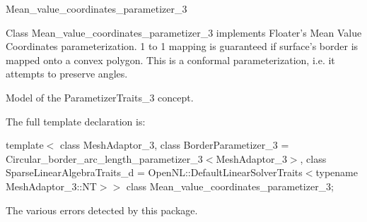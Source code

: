 

\begin{ccRefClass}{Mean_value_coordinates_parametizer_3}  %


\ccDefinition
  

Class Mean\_value\_coordinates\_parametizer\_3 implements Floater's Mean Value Coordinates parameterization. 1 to 1 mapping is guaranteed if surface's border is mapped onto a convex polygon. This is a conformal parameterization, i.e. it attempts to preserve angles.


\ccIsModel

Model of the ParametizerTraits\_3 concept.



\ccParameters

The full template declaration is:

template$<$
class MeshAdaptor\_3, 
class BorderParametizer\_3 = Circular\_border\_arc\_length\_parametizer\_3$<$MeshAdaptor\_3$>$, 
class SparseLinearAlgebraTraits\_d = OpenNL::DefaultLinearSolverTraits$<$typename MeshAdaptor\_3::NT$>$$>$ 
class Mean\_value\_coordinates\_parametizer\_3;


\ccTypes


{
}
{
The various errors detected by this package.
}
{
}
{
}
{
}
{
}
{
}
{
}
{
}
{
}
{
}
{
}
{
}
{
}
{
}
{
}
{
}
{
}
{
}
{
}
{
}
{
}
{
}
{
}
{
}
{
}



\end{ccRefClass}
